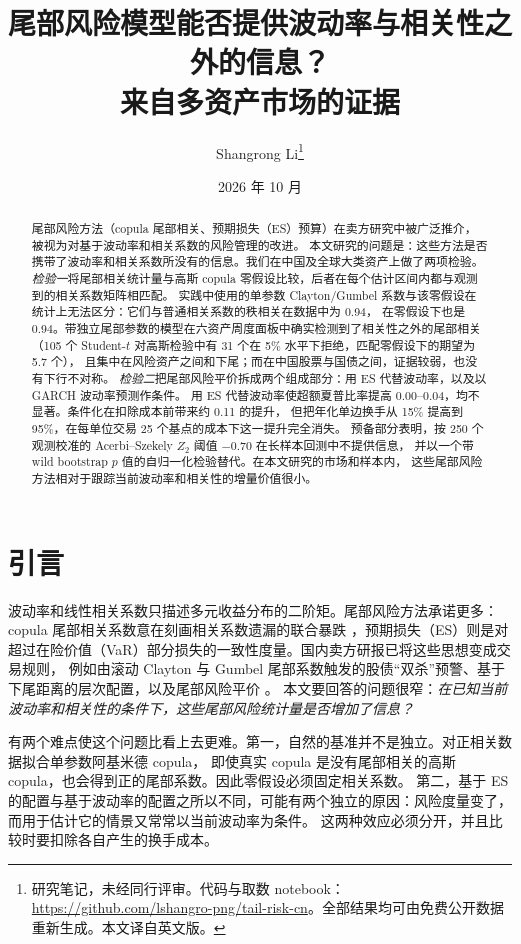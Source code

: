 \documentclass[11pt,UTF8]{ctexart}
\title{尾部风险模型能否提供波动率与相关性之外的信息？\\
\large 来自多资产市场的证据}
\author{Shangrong Li\thanks{研究笔记，未经同行评审。代码与取数 notebook：
\url{https://github.com/lshangro-png/tail-risk-cn}。全部结果均可由免费公开数据重新生成。本文译自英文版。}}
\date{2026 年 10 月}
\newcommand{\1}{\mathbf{1}}
\begin{document}
\maketitle

\begin{abstract}
\noindent
尾部风险方法（copula 尾部相关、预期损失（ES）预算）在卖方研究中被广泛推介，被视为对基于波动率和相关系数的风险管理的改进。
本文研究的问题是：这些方法是否携带了波动率和相关系数所没有的信息。我们在中国及全球大类资产上做了两项检验。
\emph{检验一}将尾部相关统计量与高斯 copula 零假设比较，后者在每个估计区间内都与观测到的相关系数矩阵相匹配。
实践中使用的单参数 Clayton/Gumbel 系数与该零假设在统计上无法区分：它们与普通相关系数的秩相关在数据中为 0.94，
在零假设下也是 0.94。带独立尾部参数的模型在六资产周度面板中确实检测到了相关性之外的尾部相关
（105 个 Student-$t$ 对高斯检验中有 31 个在 5\% 水平下拒绝，匹配零假设下的期望为 5.7 个），
且集中在风险资产之间和下尾；而在中国股票与国债之间，证据较弱，也没有下行不对称。
\emph{检验二}把尾部风险平价拆成两个组成部分：用 ES 代替波动率，以及以 GARCH 波动率预测作条件。
用 ES 代替波动率使超额夏普比率提高 0.00--0.04，均不显著。条件化在扣除成本前带来约 0.11 的提升，
但把年化单边换手从 15\% 提高到 95\%，在每单位交易 25 个基点的成本下这一提升完全消失。
预备部分表明，按 250 个观测校准的 Acerbi--Szekely $Z_2$ 阈值 $-0.70$ 在长样本回测中不提供信息，
并以一个带 wild bootstrap $p$ 值的自归一化检验替代。在本文研究的市场和样本内，
这些尾部风险方法相对于跟踪当前波动率和相关性的增量价值很小。
\end{abstract}

\section{引言}

波动率和线性相关系数只描述多元收益分布的二阶矩。尾部风险方法承诺更多：copula 尾部相关系数意在刻画相关系数遗漏的联合暴跌
\citep{embrechts2002}，预期损失（ES）则是对超过在险价值（VaR）部分损失的一致性度量。国内卖方研报已将这些思想变成交易规则，
例如由滚动 Clayton 与 Gumbel 尾部系数触发的股债``双杀''预警、基于下尾距离的层次配置，以及尾部风险平价 \citep{alankar2013}。
本文要回答的问题很窄：\emph{在已知当前波动率和相关性的条件下，这些尾部风险统计量是否增加了信息？}

有两个难点使这个问题比看上去更难。第一，自然的基准并不是独立。对正相关数据拟合单参数阿基米德 copula，
即使真实 copula 是没有尾部相关的高斯 copula，也会得到正的尾部系数。因此零假设必须固定相关系数。
第二，基于 ES 的配置与基于波动率的配置之所以不同，可能有两个独立的原因：风险度量变了，而用于估计它的情景又常常以当前波动率为条件。
这两种效应必须分开，并且比较时要扣除各自产生的换手成本。
\end{document}
